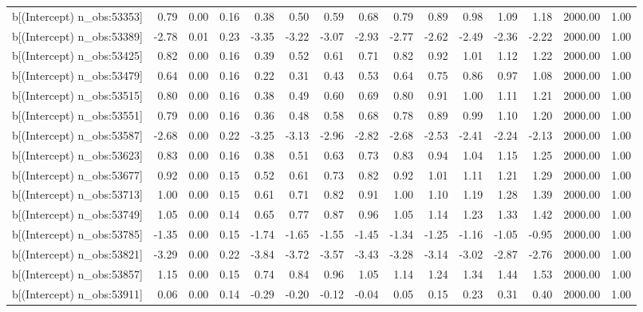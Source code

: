 \begin{table}[ht]
\begin{tabular}{rrrrrrrrrrrrrrr}
  b[(Intercept) n\_obs:53353] & 0.79 & 0.00 & 0.16 & 0.38 & 0.50 & 0.59 & 0.68 & 0.79 & 0.89 & 0.98 & 1.09 & 1.18 & 2000.00 & 1.00 \\ 
  b[(Intercept) n\_obs:53389] & -2.78 & 0.01 & 0.23 & -3.35 & -3.22 & -3.07 & -2.93 & -2.77 & -2.62 & -2.49 & -2.36 & -2.22 & 2000.00 & 1.00 \\ 
  b[(Intercept) n\_obs:53425] & 0.82 & 0.00 & 0.16 & 0.39 & 0.52 & 0.61 & 0.71 & 0.82 & 0.92 & 1.01 & 1.12 & 1.22 & 2000.00 & 1.00 \\ 
  b[(Intercept) n\_obs:53479] & 0.64 & 0.00 & 0.16 & 0.22 & 0.31 & 0.43 & 0.53 & 0.64 & 0.75 & 0.86 & 0.97 & 1.08 & 2000.00 & 1.00 \\ 
  b[(Intercept) n\_obs:53515] & 0.80 & 0.00 & 0.16 & 0.38 & 0.49 & 0.60 & 0.69 & 0.80 & 0.91 & 1.00 & 1.11 & 1.21 & 2000.00 & 1.00 \\ 
  b[(Intercept) n\_obs:53551] & 0.79 & 0.00 & 0.16 & 0.36 & 0.48 & 0.58 & 0.68 & 0.78 & 0.89 & 0.99 & 1.10 & 1.20 & 2000.00 & 1.00 \\ 
  b[(Intercept) n\_obs:53587] & -2.68 & 0.00 & 0.22 & -3.25 & -3.13 & -2.96 & -2.82 & -2.68 & -2.53 & -2.41 & -2.24 & -2.13 & 2000.00 & 1.00 \\ 
  b[(Intercept) n\_obs:53623] & 0.83 & 0.00 & 0.16 & 0.38 & 0.51 & 0.63 & 0.73 & 0.83 & 0.94 & 1.04 & 1.15 & 1.25 & 2000.00 & 1.00 \\ 
  b[(Intercept) n\_obs:53677] & 0.92 & 0.00 & 0.15 & 0.52 & 0.61 & 0.73 & 0.82 & 0.92 & 1.01 & 1.11 & 1.21 & 1.29 & 2000.00 & 1.00 \\ 
  b[(Intercept) n\_obs:53713] & 1.00 & 0.00 & 0.15 & 0.61 & 0.71 & 0.82 & 0.91 & 1.00 & 1.10 & 1.19 & 1.28 & 1.39 & 2000.00 & 1.00 \\ 
  b[(Intercept) n\_obs:53749] & 1.05 & 0.00 & 0.14 & 0.65 & 0.77 & 0.87 & 0.96 & 1.05 & 1.14 & 1.23 & 1.33 & 1.42 & 2000.00 & 1.00 \\ 
  b[(Intercept) n\_obs:53785] & -1.35 & 0.00 & 0.15 & -1.74 & -1.65 & -1.55 & -1.45 & -1.34 & -1.25 & -1.16 & -1.05 & -0.95 & 2000.00 & 1.00 \\ 
  b[(Intercept) n\_obs:53821] & -3.29 & 0.00 & 0.22 & -3.84 & -3.72 & -3.57 & -3.43 & -3.28 & -3.14 & -3.02 & -2.87 & -2.76 & 2000.00 & 1.00 \\ 
  b[(Intercept) n\_obs:53857] & 1.15 & 0.00 & 0.15 & 0.74 & 0.84 & 0.96 & 1.05 & 1.14 & 1.24 & 1.34 & 1.44 & 1.53 & 2000.00 & 1.00 \\ 
  b[(Intercept) n\_obs:53911] & 0.06 & 0.00 & 0.14 & -0.29 & -0.20 & -0.12 & -0.04 & 0.05 & 0.15 & 0.23 & 0.31 & 0.40 & 2000.00 & 1.00 \\ 

\end{tabular}
\end{table}
